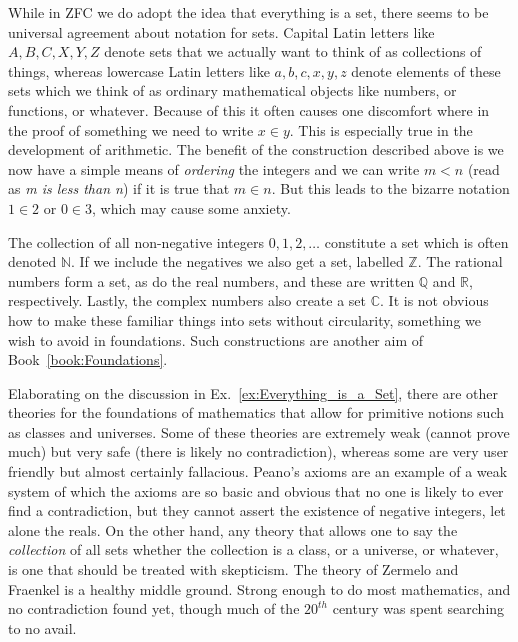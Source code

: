         While in \gls{ZFC} we do adopt the idea that everything is a set, there
        seems to be universal agreement about notation for sets. Capital Latin
        letters like $A,B,C,X,Y,Z$ denote sets that we actually want to think of
        as collections of things, whereas lowercase Latin letters like
        $a,b,c,x,y,z$ denote elements of these sets which we think of as
        ordinary mathematical objects like numbers, or functions, or whatever.
        Because of this it often causes one discomfort where in the proof of
        something we need to write $x\in{y}$. This is especially true in the
        development of arithmetic. The benefit of the construction described
        above is we now have a simple means of \textit{ordering} the integers
        and we can write $m<n$ (read as \textit{m is less than n}) if it is true
        that $m\in{n}$. But this leads to the bizarre notation $1\in{2}$ or
        $0\in{3}$, which may cause some anxiety.
        \begin{example}
            The collection of all non-negative integers $0,1,2,\dots$ constitute
            a set which is often denoted $\mathbb{N}$. If we include the
            negatives we also get a set, labelled $\mathbb{Z}$. The rational
            numbers form a set, as do the real numbers, and these are written
            $\mathbb{Q}$ and $\mathbb{R}$, respectively. Lastly, the complex
            numbers also create a set $\mathbb{C}$. It is not obvious how to
            make these familiar things into sets without circularity, something
            we wish to avoid in foundations. Such constructions are another aim
            of Book~\ref{book:Foundations}.
        \end{example}
        Elaborating on the discussion in Ex.~\ref{ex:Everything_is_a_Set}, there
        are other theories for the foundations of mathematics that allow for
        primitive notions such as classes and universes. Some of these theories
        are extremely weak (cannot prove much) but very safe (there is likely no
        contradiction), whereas some are very user friendly but almost certainly
        fallacious. Peano's axioms are an example of a weak system of which the
        axioms are so basic and obvious that no one is likely to ever find a
        contradiction, but they cannot assert the existence of negative
        integers, let alone the reals. On the other hand, any theory that
        allows one to say the \textit{collection} of all sets whether the
        collection is a class, or a universe, or whatever, is one that should be
        treated with skepticism. The theory of Zermelo and Fraenkel is a healthy
        middle ground. Strong enough to do most mathematics, and no
        contradiction found yet, though much of the $20^{th}$ century was spent
        searching to no avail.

